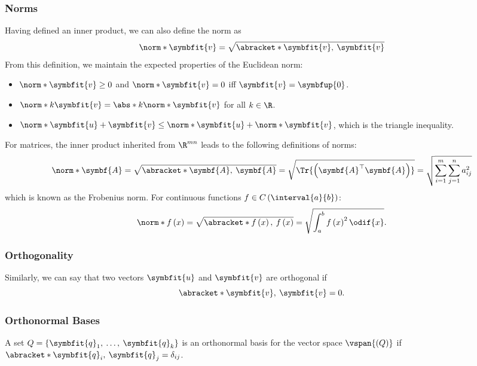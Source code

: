 \documentclass{article}
\begin{document}
\subsubsection{Norms}
Having defined an inner product, we can also define the norm as
\begin{equation*}
    \norm*{\symbfit{v}} = \sqrt{\abracket*{\symbfit{v},\: \symbfit{v}}}
\end{equation*}
From this definition, we maintain the expected properties of the Euclidean norm:
\begin{itemize}
    \item \(\norm*{\symbfit{v}} \geq 0\) and \(\norm*{\symbfit{v}} = 0\) iff \(\symbfit{v} = \symbfup{0}\).
    \item \(\norm*{k \symbfit{v}} = \abs*{k} \norm*{\symbfit{v}}\) for all \(k \in \R\).
    \item \(\norm*{\symbfit{u} + \symbfit{v}} \leq \norm*{\symbfit{u}} + \norm*{\symbfit{v}}\), which is the triangle inequality.
\end{itemize}
For matrices, the inner product inherited from \(\R^{mn}\) leads to the following definitions of norms:
\begin{equation*}
    \norm*{\symbf{A}} = \sqrt{\abracket*{\symbf{A},\: \symbf{A}}} = \sqrt{\Tr{\left( \symbf{A}^\top \symbf{A} \right)}} = \sqrt{\sum_{i = 1}^m \sum_{j = 1}^n a_{ij}^2}
\end{equation*}
which is known as the Frobenius norm. For continuous functions \(f \in C\left( \interval{a}{b} \right)\):\
\begin{equation*}
    \norm*{f\left( x \right)} = \sqrt{\abracket*{f\left( x \right),\: f\left( x \right)}} = \sqrt{\int_a^b f\left( x \right)^2 \odif{x}}.
\end{equation*}
\subsubsection{Orthogonality}
Similarly, we can say that two vectors \(\symbfit{u}\) and \(\symbfit{v}\) are orthogonal if
\begin{equation*}
    \abracket*{\symbfit{v},\: \symbfit{v}} = 0.
\end{equation*}
\subsubsection{Orthonormal Bases}
A set \(Q = \left\{ \symbfit{q}_1,\: \dots,\: \symbfit{q}_k \right\}\) is an orthonormal basis for the vector space \(\vspan{\left( Q \right)}\) if
\(\abracket*{\symbfit{q}_i,\: \symbfit{q}_j} = \delta_{ij}\).
\end{document}
